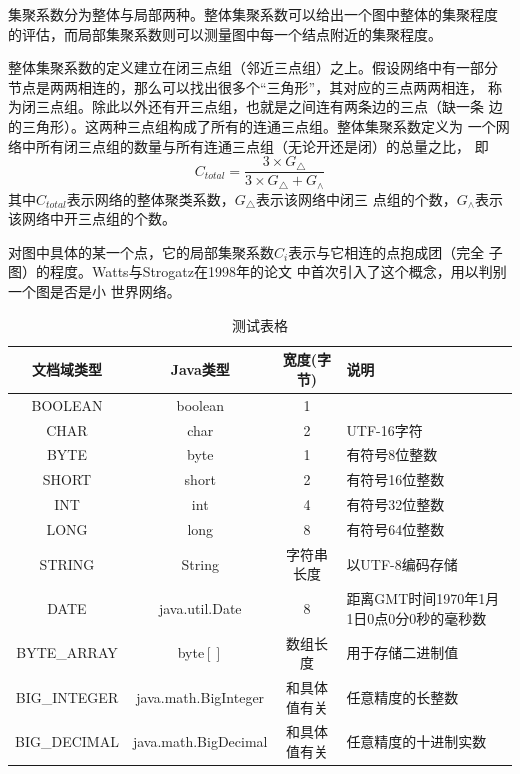 \documentclass[master]{njuthesis}
\begin{document}
集聚系数分为整体与局部两种。整体集聚系数可以给出一个图中整体的集聚程度
的评估，而局部集聚系数则可以测量图中每一个结点附近的集聚程度。

\begin{definition}[整体聚类系数]
整体集聚系数的定义建立在闭三点组（邻近三点组）之上。假设网络中有一部分
节点是两两相连的，那么可以找出很多个“三角形”，其对应的三点两两相连，
称为闭三点组。除此以外还有开三点组，也就是之间连有两条边的三点（缺一条
  边的三角形）。这两种三点组构成了所有的连通三点组。整体集聚系数定义为
一个网络中所有闭三点组的数量与所有连通三点组（无论开还是闭）的总量之比，
即
\[
    C_{total}=\frac{3\times G_{\triangle}}{3 \times G_{\triangle} + G_{\wedge}}
\]
其中$C_{total}$表示网络的整体聚类系数，$G_{\triangle}$表示该网络中闭三
点组的个数，$G_{\wedge}$表示该网络中开三点组的个数\cite{luce1949method}。
\end{definition}

对图中具体的某一个点，它的局部集聚系数$C_i$表示与它相连的点抱成团（完全
  子图）的程度。Watts与Strogatz在1998年的论文
\cite{watts1998smallworld}中首次引入了这个概念，用以判别一个图是否是小
世界网络。

\begin{table}
  \centering
  \begin{tabular}{cccp{38mm}}
    \toprule
    \textbf{文档域类型} & \textbf{Java类型} & \textbf{宽度(字节)} & \textbf{说明} \\
    \midrule
    BOOLEAN  & boolean &  1  & \\
    CHAR     & char    &  2  & UTF-16字符 \\
    BYTE     & byte    &  1  & 有符号8位整数 \\
    SHORT    & short   &  2  & 有符号16位整数 \\
    INT      & int     &  4  & 有符号32位整数 \\
    LONG     & long    &  8  & 有符号64位整数 \\
    STRING   & String  &  字符串长度  & 以UTF-8编码存储 \\
    DATE     & java.util.Date & 8 & 距离GMT时间1970年1月1日0点0分0秒的毫秒数 \\
    BYTE\_ARRAY & byte$[]$ & 数组长度 & 用于存储二进制值 \\
    BIG\_INTEGER & java.math.BigInteger & 和具体值有关 & 任意精度的长整数 \\
    BIG\_DECIMAL & java.math.BigDecimal & 和具体值有关 & 任意精度的十进制实数 \\
    \bottomrule
  \end{tabular}
  \caption{测试表格}\label{table:test4}
\end{table}
\end{document}
